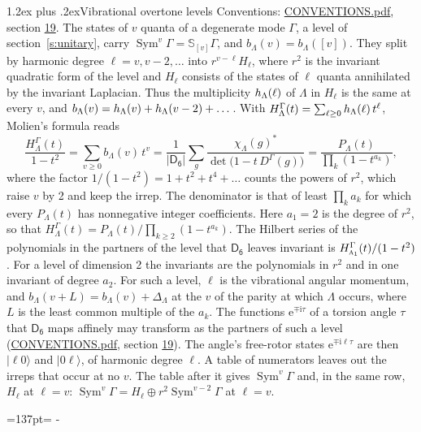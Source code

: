 \documentclass[10pt,a4paper]{article}
\makeatletter
\renewcommand\section{\@startsection{section}{1}{\z@}{-3ex plus -1ex minus -.2ex}%
  {1.2ex plus .2ex}{\normalfont\large\sffamily\bfseries\color{parttitle}}}
\newcommand{\needspace}[1]{\par\penalty-100\begingroup\dimen0=#1\relax\dimen2=\pagegoal
  \advance\dimen2-\pagetotal\ifdim\dimen0>\dimen2\relax\ifdim\dimen2>0pt\vfil\break\fi\fi
  \endgroup}
\numberwithin{equation}{section}
\newcommand{\grp}[1]{\mathsf{#1}}
\newcommand{\irr}[1]{\text{\normalfont\scshape #1}}
\newcommand{\iunit}{\mathrm{i}}
\newcommand{\expe}{\mathrm{e}}
\newcommand{\repD}[1]{D^{#1}}
\newcommand{\irchar}[1]{\chi_{#1}}
\newcommand{\conj}[1]{{#1}^{*}}
\newcommand{\schur}[1]{\mathbb{S}_{#1}}
\newcommand{\shape}[1]{[#1]}
\newcommand{\occ}[1]{\lvert #1\rangle}
\makeatother
\begin{document}
\section{Vibrational overtone levels}\label{s:overtones}
Conventions: \href{../../CONVENTIONS.pdf}{CONVENTIONS.pdf}, section \href{../../CONVENTIONS.pdf\#conv.19}{19}.
\leavevmode\label{n:index.quanta}\label{n:operator.symmetric.power}The states of $v$ quanta of a degenerate mode $\Gamma$, a level of section~\ref{s:unitary}, carry $\operatorname{Sym}^{v}\Gamma = \schur{\shape{v}}\Gamma$, and $b_\Lambda(v) = b_\Lambda(\shape{v})$. \label{n:local.quadratic.form}\label{n:set.harmonic}They split by harmonic degree $\ell = v, v - 2, \dots$ into $r^{v-\ell}H_\ell$, where $r^2$ is the invariant quadratic form of the level and $H_\ell$ consists of the states of $\ell$ quanta annihilated by the invariant Laplacian. \label{n:function.multiplicity.harmonic}Thus the multiplicity $\mathnormal{h}_\Lambda(\ell)$ of $\Lambda$ in $H_\ell$ is the same at every $v$, and $b_\Lambda(v) = \mathnormal{h}_\Lambda(v) + \mathnormal{h}_\Lambda(v - 2) + \dots$. \label{n:function.generating.level}With $H^{\Gamma}_\Lambda(t) = \sum_{\ell\ge0} \mathnormal{h}_\Lambda(\ell)\,t^{\ell}$, Molien's formula reads
\begin{equation}\label{e:molien}\frac{H^{\Gamma}_\Lambda(t)}{1 - t^2} = \sum_{v\ge0} b_\Lambda(v)\,t^v = \frac{1}{|\grp{D_{6}}|}\sum_{g}\frac{\conj{\irchar{\Lambda}(g)}}{\det\bigl(1 - t\,\repD{\Gamma}(g)\bigr)} = \frac{P_\Lambda(t)}{\prod_k (1-t^{a_k})},\end{equation}
where the factor $1/(1 - t^2) = 1 + t^2 + t^4 + \dots$ counts the powers of $r^2$, which raise $v$ by 2 and keep the irrep. The denominator is that of least $\prod_k a_k$ for which every $P_\Lambda(t)$ has nonnegative integer coefficients. Here $a_1 = 2$ is the degree of $r^2$, so that $H^{\Gamma}_\Lambda(t) = P_\Lambda(t)/\prod_{k\ge2}(1 - t^{a_k})$. The Hilbert series of the polynomials in the partners of the level that $\grp{D_{6}}$ leaves invariant is $H^{\Gamma}_{\irr{a}_{1}}(t)/(1 - t^2)$. For a level of dimension 2 the invariants are the polynomials in $r^2$ and in one invariant of degree $a_2$. \label{n:index.overtone.period}\label{n:index.increment.unitary}For such a level, $\ell$ is the vibrational angular momentum, and $b_\Lambda(v + L) = b_\Lambda(v) + \Delta_\Lambda$ at the $v$ of the parity at which $\Lambda$ occurs, where $L$ is the least common multiple of the $a_k$. \label{n:local.torsion.angle}The functions $\expe^{\mp\iunit\tau}$ of a torsion angle $\tau$ that $\grp{D_{6}}$ maps affinely may transform as the partners of such a level (\href{../../CONVENTIONS.pdf}{CONVENTIONS.pdf}, section \href{../../CONVENTIONS.pdf\#conv.19}{19}). The angle's free-rotor states $\expe^{\mp\iunit\ell\tau}$ are then $\occ{\ell 0}$ and $\occ{0 \ell}$, of harmonic degree $\ell$. A table of numerators leaves out the irreps that occur at no $v$. The table after it gives $\operatorname{Sym}^{v}\Gamma$ and, in the same row, $H_\ell$ at $\ell = v$: $\operatorname{Sym}^{v}\Gamma = H_\ell \oplus r^2\operatorname{Sym}^{v-2}\Gamma$ at $\ell = v$.
\needspace{137pt}
\end{document}
